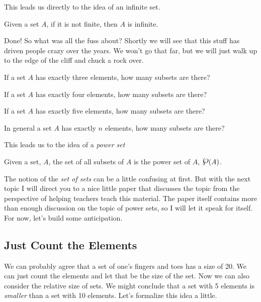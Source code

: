 This leads us directly to the idea of an infinite set.

\begin{definition}
Given a set $A$, if it is not finite, then $A$ is infinite.
\end{definition}

Done!  So what was all the fuss about?  Shortly we will see that this stuff has driven people crazy over the years.  We won't go that far, but we will just walk up to the edge of the cliff and chuck a rock over.

\begin{problem}
If a set $A$ has exactly three elements, how many subsets are there?
\end{problem}

\begin{problem}
If a set $A$ has exactly four elements, how many subsets are there?
\end{problem}


\begin{problem}
If a set $A$ has exactly five elements, how many subsets are there?
\end{problem}

\begin{problem}In general a set $A$ has exactly $n$ elements, how many subsets are there?
\end{problem}
This leads us to the idea of a \emph{power set}
\begin{definition}
Given a set, $A$, the set of all subsets of $A$ is the power set of $A$, $\powerset (A)$.
\end{definition}
The notion of the \emph{set of sets} can be a little confusing at first.  But with the next topic I will direct you to a nice little paper that discusses the topic from the perspective of helping teachers teach this material. The paper itself contains more than enough discussion on the topic of power sets, so I will let it speak for itself.  For now, let's build some anticipation.
\subsection*{Just Count the Elements}
We can probably agree that a set of one's fingers and toes has a size of 20.  We can just count the elements and let that be the size of the set.  Now we can also consider the relative size of sets.  We might conclude that a set with 5 elements is \emph{smaller} than a set with 10 elements.  Let's formalize this idea a little.

